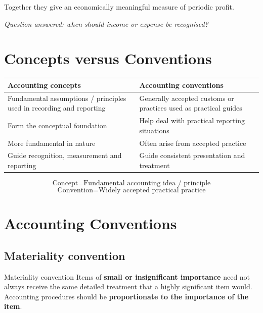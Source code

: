 \documentclass[11pt,a4paper]{article}
\begin{document}
Together they give an economically meaningful measure of periodic profit.

\begin{keybox}
\emph{Question answered: when should income or expense be recognised?}
\end{keybox}

\section{Concepts versus Conventions}

\begin{center}
\small
\begin{tabularx}{\textwidth}{@{}Y Y@{}}
\toprule
{}\textbf{Accounting concepts} & \textbf{Accounting conventions}\\
\midrule
Fundamental assumptions / principles used in recording and reporting & Generally accepted customs or practices used as practical guides\\
Form the conceptual foundation & Help deal with practical reporting situations\\
More fundamental in nature & Often arise from accepted practice\\
Guide recognition, measurement and reporting & Guide consistent presentation and treatment\\
\bottomrule
\end{tabularx}
\end{center}

\[
\boxed{\text{Concept}=\text{Fundamental accounting idea / principle}}
\]
\[
\boxed{\text{Convention}=\text{Widely accepted practical practice}}
\]

\section{Accounting Conventions}

\subsection{Materiality convention}

\begin{defbox}{Materiality convention}
Items of \textbf{small or insignificant importance} need not always receive the same detailed treatment that a highly
significant item would. Accounting procedures should be \textbf{proportionate to the importance of the item}.
\end{defbox}
\end{document}
